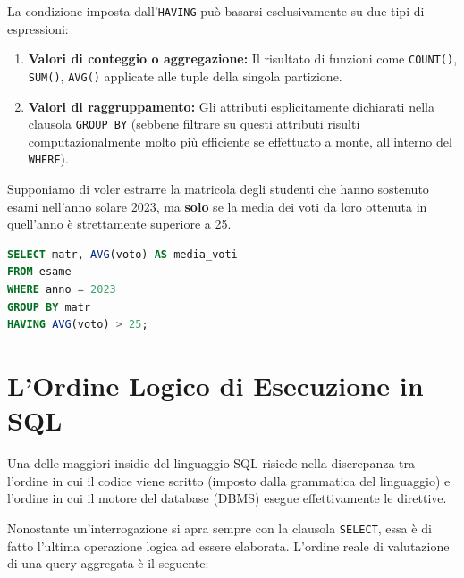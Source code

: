 La condizione imposta dall'\texttt{HAVING} può basarsi esclusivamente su due tipi di espressioni:
\begin{enumerate}
    \item \textbf{Valori di conteggio o aggregazione:} Il risultato di funzioni come \texttt{COUNT()}, \texttt{SUM()}, \texttt{AVG()} applicate alle tuple della singola partizione.
    \item \textbf{Valori di raggruppamento:} Gli attributi esplicitamente dichiarati nella clausola \texttt{GROUP BY} (sebbene filtrare su questi attributi risulti computazionalmente molto più efficiente se effettuato a monte, all'interno del \texttt{WHERE}).
\end{enumerate}

\begin{example}
Supponiamo di voler estrarre la matricola degli studenti che hanno sostenuto esami nell'anno solare 2023, ma \textbf{solo} se la media dei voti da loro ottenuta in quell'anno è strettamente superiore a 25.

\begin{lstlisting}[language=SQL, basicstyle=\ttfamily\small, keywordstyle=\color{blue}\bfseries]
SELECT matr, AVG(voto) AS media_voti
FROM esame
WHERE anno = 2023
GROUP BY matr
HAVING AVG(voto) > 25;
\end{lstlisting}

\end{example}


\section{L'Ordine Logico di Esecuzione in SQL}

Una delle maggiori insidie del linguaggio SQL risiede nella discrepanza tra l'ordine in cui il codice viene scritto (imposto dalla grammatica del linguaggio) e l'ordine in cui il motore del database (DBMS) esegue effettivamente le direttive. 

Nonostante un'interrogazione si apra sempre con la clausola \texttt{SELECT}, essa è di fatto l'ultima operazione logica ad essere elaborata. L'ordine reale di valutazione di una query aggregata è il seguente:

